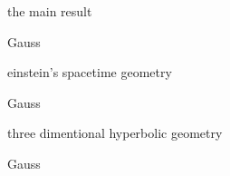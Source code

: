 \documentclass{article}
\newenvironment{andrew_section}[1]
    {
    \section{#1}
    \begin{itemize}
    }
    {
    \end{itemize}
    }
\begin{document}
\begin{andrew_section}{the main result}
    \item 
        Gauss
\end{andrew_section}

\begin{andrew_section}{einstein's spacetime geometry}
    \item 
        Gauss
\end{andrew_section}

\begin{andrew_section}{three dimentional hyperbolic geometry}
    \item 
        Gauss
\end{andrew_section}
\end{document}
